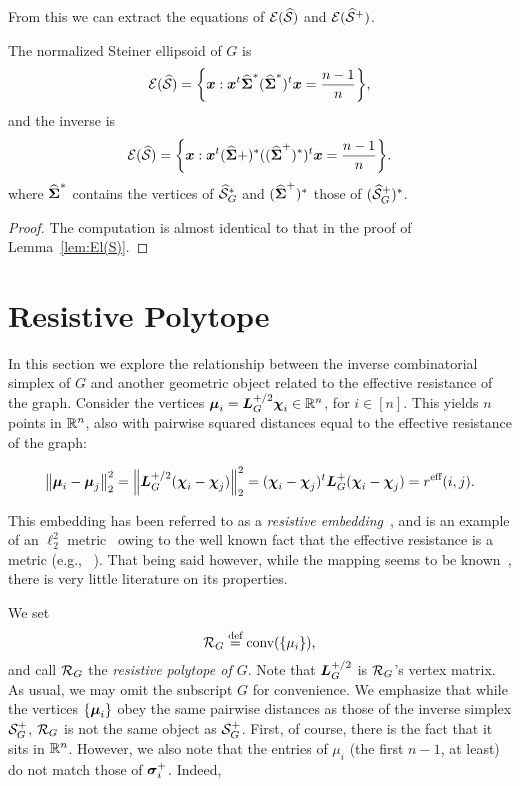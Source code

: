 From this we can extract the equations of $\mathcal{E}(\widehat{\mathcal{S}})$ and $\mathcal{E}(\widehat{\mathcal{S}}^+)$. 

\begin{corollary}
	\label{cor:El(Sn)}
	The normalized Steiner ellipsoid of $G$ is 
	\begin{equation*}
	\mathcal{E}(\widehat{\mathcal{S}}) = \bigg\{\vb*{x}:\vb*{x}^t \widehat{\boldsymbol{\Sigma}}^*(\widehat{\boldsymbol{\Sigma}}^*)^t\vb*{x} = \frac{n-1}{n}\bigg\},
	\end{equation*}
	and the inverse is 
	\begin{equation*}
		\mathcal{E}(\widehat{\mathcal{S}}) = \bigg\{\vb*{x}:\vb*{x}^t (\widehat{\boldsymbol{\Sigma}}+)^*((\widehat{\boldsymbol{\Sigma}}^+)^*)^t\vb*{x} = \frac{n-1}{n}\bigg\}.
	\end{equation*}
	where $\widehat{\boldsymbol{\Sigma}}^*$ contains the vertices of $\widehat{\mathcal{S}}_G^*$ and $(\widehat{\boldsymbol{\Sigma}}^+)^*$ those of $(\widehat{\mathcal{S}}_G^+)^*$. 
\end{corollary}
\begin{proof}
	The computation is almost identical to that in the proof of Lemma~\ref{lem:El(S)}.
\end{proof}



\section{Resistive Polytope}
\label{sec:resistive_polytope}
In this section we explore the relationship between the inverse combinatorial simplex of $G$ and another geometric object related to the effective resistance of the graph. Consider the vertices $\vb*{\mu}_i=\vb*{L}_G^{+/2}\boldsymbol{\chi}_i\in\mathbb{R}^n$, for $i\in[n]$. This yields $n$ points in $\mathbb{R}^n$, also with pairwise squared distances equal to the effective resistance of the graph: 

\begin{equation*}
\norm{\vb*{\mu}_i-\vb*{\mu}_j}_2^2 = \norm{\vb*{L}_G^{+/2}(\boldsymbol{\chi}_i-\boldsymbol{\chi}_j)}_2^2 =  (\boldsymbol{\chi}_i-\boldsymbol{\chi}_j)^t \vb*{L}_G^+(\boldsymbol{\chi}_i-\boldsymbol{\chi}_j)=r^{\text{eff}}(i,j).
\end{equation*}

This embedding has been referred to as a \emph{resistive embedding}~\cite{shayanNotes,ding2011cover}, and is an example of an $\ell_2^2$ metric~\cite{arora2009expander} owing  to the well known fact that the effective resistance is a metric (e.g., ~\cite{klein1993resistance}). That being said however, while the mapping seems to be known~\cite{ghosh2008minimizing}, there is very little literature on its properties. 

We  set 
\begin{equation}
\label{eq:res_pol}
\mathcal{R}_G \overset{\text{def}}{=} \textnormal{conv}(\{\mu_i\}),
\end{equation}
and  call  $\mathcal{R}_G$ the \emph{resistive polytope of $G$}. Note that $\vb*{L}_G^{+/2}$ is $\mathcal{R}_G$'s vertex matrix. As usual, we may omit the subscript $G$ for convenience. We emphasize that while the vertices $\{\vb*{\mu}_i\}$ obey the same pairwise  distances as  those of the inverse simplex $\mathcal{S}_G^+$, $\mathcal{R}_G$  is not the same object as $\mathcal{S}_G^+$. First, of course, there is  the fact that it sits in  $\mathbb{R}^n$. However,  we also note that the entries of $\mu_i$ (the first $n-1$, at least) do not match those of $\vb*{\sigma}_i^+$. Indeed, 

